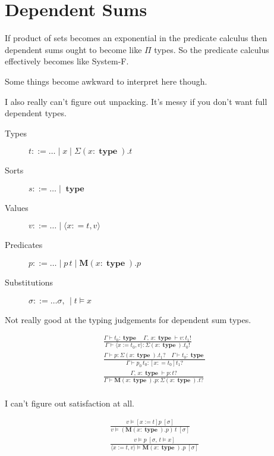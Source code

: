 \documentclass[twocolumn, fleqn]{scrartcl}
\newcommand{\bnfdef}{\mathbin{::=}}
\DeclareMathOperator{\type}{\textbf{type}}
\DeclareMathOperator{\update}{:=}
\begin{document}
\section*{Dependent Sums}

If product of sets becomes an exponential in the predicate calculus
then dependent sums ought to become like \(\Pi\) types.  So the
predicate calculus effectively becomes like System-F.

Some things become awkward to interpret here though.

I also really can't figure out unpacking. It's messy if you don't want
full dependent types.

\begin{description}
\item[Types] \( t \bnfdef \ldots \mid x \mid \Sigma (x \colon \type). t \)
\item[Sorts] \( s \bnfdef \ldots \mid \type \)
\item[Values] \( v \bnfdef \ldots \mid \langle x \colon= t , v \rangle \)
\item[Predicates] \( p \bnfdef \ldots \mid p \, t \mid \textbf{M} (x \colon \type). p \)
\item[Substitutions] \( \sigma \bnfdef \ldots \sigma , \, \mid t \models x \)
\end{description}

Not really good at the typing judgements for dependent sum types.

\begin{multline*}
\frac{
  \Gamma \vdash t_0 \colon \type \quad
  \Gamma , \, x \colon \type \vdash v \colon t_1 !
}{
  \Gamma \vdash \langle x \update t_0 , v \rangle \colon \Sigma (x \colon \type). t_0 !
}\\
\frac{
  \Gamma \vdash p \colon \Sigma (x\colon \type). t_1 ? \quad
  \Gamma \vdash t_0 \colon \type
}{
  \Gamma \vdash p_0 \, t_0 \colon [x \colon= t_0] t_1 ?
}\\
\frac{
  \Gamma , \, x \colon \type \vdash p \colon t ?
}{
  \Gamma \vdash \textbf{M} (x \colon \type). p \colon \Sigma (x\colon \type). t ?
}\\
\end{multline*}

I can't figure out satisfaction at all.

\begin{multline*}
\frac{
  v \models [x \update t] p \; [\sigma]
}{
  v \models ( \textbf{M} (x \colon \type). p) \, t \; [\sigma]
}\\
\frac{
  v \models p \; [ \sigma , \, t \models x]
}{
  \langle x \update t , v \rangle \models \textbf{M} (x \colon \type). p \; [\sigma]
}\\
\end{multline*}
\end{document}
